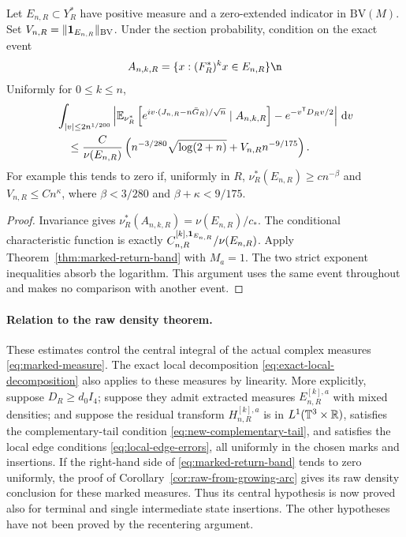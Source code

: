 \begin{corollary}
\label{cor:marked-state-conditioning}
Let $E_{n,R}\subset Y_R^*$ have positive measure and a zero-extended
indicator in $\mathrm{BV}(M)$. Set
$V_{n,R}=\|\mathbf1_{E_{n,R}}\|_{\mathrm{BV}}$. Under the section probability,
condition on the exact event
\[
 A_{n,k,R}=\{x:(F_R^*)^kx\in E_{n,R}\}\n\]
Uniformly for $0\le k\le n$,
\begin{align}
 &\int_{|v|\le2n^{1/200}}
 \left|\mathbb E_{\nu_R^*}\left[
 e^{iv\cdot(J_{n,R}-n\bar G_R)/\sqrt n}\mid A_{n,k,R}\right]
          -e^{-v^{\mathsf T}D_Rv/2}\right|\,\mathrm d v\notag\\
 &\quad\le\frac{C}{\nu(E_{n,R})}
  \left(n^{-3/280}\sqrt{\log(2+n)}+V_{n,R}n^{-9/175}\right).
       \label{eq:marked-conditional-band}
\end{align}
For example this tends to zero if, uniformly in $R$,
$\nu_R^*(E_{n,R})\ge c n^{-\beta}$ and $V_{n,R}\le Cn^\kappa$,
where $\beta<3/280$ and $\beta+\kappa<9/175$.
\end{corollary}
\begin{proof}
Invariance gives $\nu_R^*(A_{n,k,R})=\nu(E_{n,R})/c_*$.
The conditional characteristic function is exactly
$C^{[k],\mathbf1_{E_{n,R}}}_{n,R}/\nu(E_{n,R})$. Apply
Theorem~\ref{thm:marked-return-band} with $M_a=1$. The two strict
exponent inequalities absorb the logarithm. This argument uses the
same event throughout and makes no comparison with another event.
\end{proof}

\paragraph{Relation to the raw density theorem.}
These estimates control the central integral of the actual complex
measures \eqref{eq:marked-measure}. The exact local decomposition
\eqref{eq:exact-local-decomposition} also applies to these measures by
linearity. More explicitly, suppose $D_R\ge d_0 I_4$; suppose they admit
extracted measures $E^{[k],a}_{n,R}$ with mixed densities; and suppose
the residual transform $H^{[k],a}_{n,R}$ is in
$L^1(\mathbb T^3\times\mathbb R)$, satisfies the complementary-tail condition
\eqref{eq:new-complementary-tail}, and satisfies the local edge
conditions \eqref{eq:local-edge-errors}, all uniformly in the chosen
marks and insertions. If the right-hand side of
\eqref{eq:marked-return-band} tends to zero uniformly, the proof of
Corollary~\ref{cor:raw-from-growing-arc} gives its raw density conclusion
for these marked measures. Thus its central hypothesis is now proved
also for terminal and single intermediate state insertions. The other
hypotheses have not been proved by the recentering argument.

